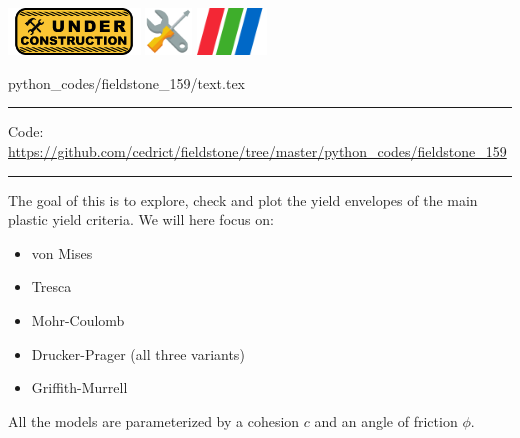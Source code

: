 \noindent
\includegraphics[height=1.25cm]{images/pictograms/under_construction}
\includegraphics[height=1.25cm]{images/pictograms/tools}
\includegraphics[height=1.25cm]{images/pictograms/paraview}


\begin{flushright} {\tiny {\color{gray} python\_codes/fieldstone\_159/text.tex}} \end{flushright}

%

\par\noindent\rule{\textwidth}{0.4pt}

\begin{center}
\inpython
{\small Code: \url{https://github.com/cedrict/fieldstone/tree/master/python_codes/fieldstone_159}}
\end{center}

\par\noindent\rule{\textwidth}{0.4pt}


The goal of this \stone is to explore, check and plot the yield envelopes of 
the main plastic yield criteria.
We will here focus on:
\begin{itemize} 
\item von Mises
\item Tresca
\item Mohr-Coulomb
\item Drucker-Prager (all three variants)
\item Griffith-Murrell
\end{itemize} 
All the models are parameterized by a cohesion $c$ and an angle of friction $\phi$. 

